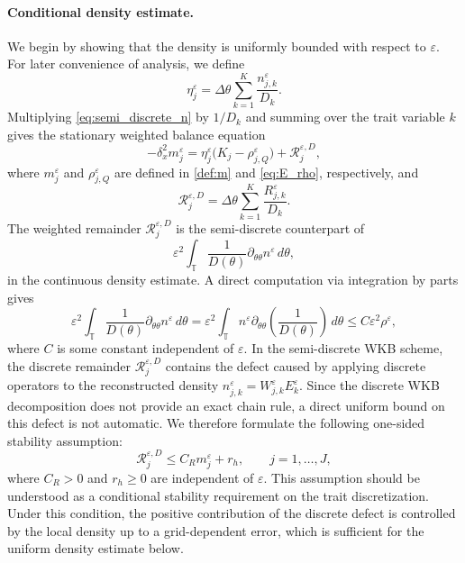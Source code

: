 \documentclass[11pt, dina4, amsfont12]{article}
\begin{document}
\paragraph{Conditional density estimate.}
We begin by showing that the density is uniformly bounded with respect to $\varepsilon$. 
For later convenience of analysis, we define
\[
    \eta_j^\varepsilon
    =
    \Delta\theta
    \sum_{k=1}^K
    \frac{n_{j,k}^\varepsilon}{D_k}.
\]
Multiplying \eqref{eq:semi_discrete_n} by \(1/D_k\) and summing over the
trait variable $k$ gives the stationary weighted balance equation 
\begin{equation}\label{eq:weighted_summed_density_stationary}
    -\delta_x^2m_j^\varepsilon
    =
    \eta_j^\varepsilon
    \bigl(K_j-\rho_{j,Q}^\varepsilon\bigr)
    +
    \mathcal R_j^{\varepsilon,D}, 
\end{equation}
where $m_j^\varepsilon$ and $\rho_{j,Q}^\varepsilon$ are defined in \eqref{def:m} and \eqref{eq:E_rho}, respectively, 
and
\[
	 \mathcal R_j^{\varepsilon,D} = \Delta\theta
    \sum_{k=1}^K
    \frac{R_{j,k}^\varepsilon}{D_k}.
\]
The weighted remainder \(\mathcal R_j^{\varepsilon,D}\) is the semi-discrete
counterpart of 
\[
	 \varepsilon^2
    \int_{\mathbb T}
    \frac1{D(\theta)}
     \partial_{\theta\theta} n^\varepsilon
    \,d\theta ,
\]
in the continuous density
estimate. 
A direct computation via integration by parts  gives
\[
    \varepsilon^2
    \int_{\mathbb T}
    \frac1{D(\theta)}
     \partial_{\theta\theta} n^\varepsilon
    \,d\theta  
    =
    \varepsilon^2
    \int_{\mathbb T}
    n^\varepsilon
    \partial_{\theta\theta}
    \left(\frac1{D(\theta)}\right)
    \,d\theta \le C\varepsilon^2\rho^\varepsilon, 
\]
where \(C\) is some constant independent of $\varepsilon$. 
In the semi-discrete WKB scheme, the discrete remainder
\(\mathcal R_j^{\varepsilon,D}\) contains the defect caused by applying
discrete operators to the reconstructed density
\(n_{j,k}^\varepsilon=W_{j,k}^\varepsilon E_k^\varepsilon\). Since the
discrete WKB decomposition does not provide an exact chain rule, a direct
uniform bound on this defect is not automatic. We therefore formulate the
following one-sided stability assumption:
\begin{equation}\label{eq:remainder_CR_bound}
    \mathcal R_j^{\varepsilon,D}
    \le
    C_R m_j^\varepsilon+r_h,
    \qquad j=1,\ldots,J,
\end{equation}
where \(C_R>0\) and \(r_h\ge0\) are independent of \(\varepsilon\). This
assumption should be understood as a conditional stability requirement on the
trait discretization. Under this condition, the positive contribution of the
discrete defect is controlled by the local density up to a grid-dependent
error, which is sufficient for the uniform density estimate below.
\end{document}
